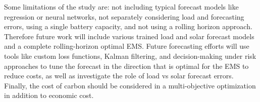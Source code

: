 \documentclass[conference]{IEEEtran}
\begin{document}
Some limitations of the study are: not including typical forecast models like regression or neural networks, not separately considering load and forecasting errors, using a single battery capacity, and not using a rolling horizon approach. Therefore future work will include various trained load and solar forecast models and a complete rolling-horizon optimal EMS. Future forecasting efforts will use tools like custom loss functions, Kalman filtering, and decision-making under risk approaches to tune the forecast in the direction that is optimal for the EMS to reduce costs, as well as investigate the role of load vs solar forecast errors. Finally, the cost of carbon should be considered in a multi-objective optimization in addition to economic cost.



\end{document}
